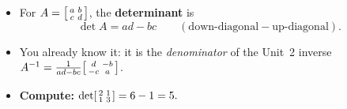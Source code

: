 \documentclass[aspectratio=169, 11pt]{beamer}
\begin{document}
\begin{frame}[t, plain]
  \begin{itemize}
    \setlength{\itemsep}{6pt}
    \item For $A=\begin{bsmallmatrix} a & b\\ c & d \end{bsmallmatrix}$, the \textbf{determinant} is
          \[ \det A = ad - bc \qquad(\text{down-diagonal} - \text{up-diagonal}). \]
    \item You already know it: it is the \emph{denominator} of the Unit~2 inverse
          $A^{-1}=\frac{1}{ad-bc}\begin{bsmallmatrix} d & -b\\ -c & a \end{bsmallmatrix}$.
    \item \textbf{Compute:} $\det\begin{bsmallmatrix} 2 & 1\\ 1 & 3 \end{bsmallmatrix}=6-1=5.$
  \end{itemize}
\end{frame}
\end{document}
